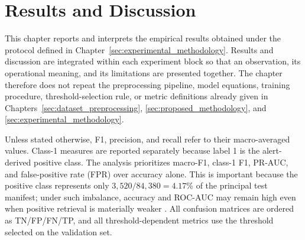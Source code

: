 \documentclass[11pt,fleqn]{report}
\begin{document}

%
\providecommand{\resultsfigurepath}{MScCS/figures}

\chapter{Results and Discussion}
\label{sec:results}

This chapter reports and interprets the empirical results obtained under the
protocol defined in Chapter~\ref{sec:experimental_methodology}. Results and
discussion are integrated within each experiment block so that an observation,
its operational meaning, and its limitations are presented together. The
chapter therefore does not repeat the preprocessing pipeline, model equations,
training procedure, threshold-selection rule, or metric definitions already
given in Chapters~\ref{sec:dataset_preprocessing},
\ref{sec:proposed_methodology}, and
\ref{sec:experimental_methodology}.

Unless stated otherwise, F1, precision, and recall refer to their
macro-averaged values. Class-1 measures are reported separately because label
1 is the alert-derived positive class. The analysis prioritizes macro-F1,
class-1 F1, PR-AUC, and false-positive rate (FPR) over accuracy alone. This is
important because the positive class represents only $3{,}520/84{,}380=4.17\%$
of the principal test manifest; under such imbalance, accuracy and ROC-AUC may
remain high even when positive retrieval is materially weaker
\cite{SaitoRehmsmeier2015}. All confusion matrices are ordered as
TN/FP/FN/TP, and all threshold-dependent metrics use the threshold selected on
the validation set.
\end{document}
